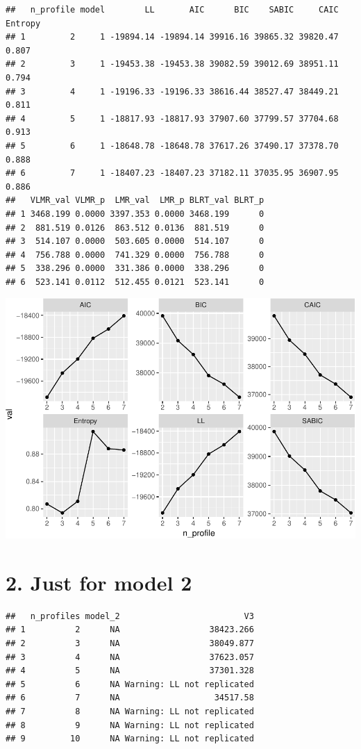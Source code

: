 \documentclass[]{book}
\theoremstyle{definition}
\theoremstyle{definition}
\theoremstyle{definition}
\theoremstyle{remark}
\begin{document}
\begin{verbatim}
##   n_profile model        LL       AIC      BIC    SABIC     CAIC Entropy
## 1         2     1 -19894.14 -19894.14 39916.16 39865.32 39820.47   0.807
## 2         3     1 -19453.38 -19453.38 39082.59 39012.69 38951.11   0.794
## 3         4     1 -19196.33 -19196.33 38616.44 38527.47 38449.21   0.811
## 4         5     1 -18817.93 -18817.93 37907.60 37799.57 37704.68   0.913
## 5         6     1 -18648.78 -18648.78 37617.26 37490.17 37378.70   0.888
## 6         7     1 -18407.23 -18407.23 37182.11 37035.95 36907.95   0.886
##   VLMR_val VLMR_p  LMR_val  LMR_p BLRT_val BLRT_p
## 1 3468.199 0.0000 3397.353 0.0000 3468.199      0
## 2  881.519 0.0126  863.512 0.0136  881.519      0
## 3  514.107 0.0000  503.605 0.0000  514.107      0
## 4  756.788 0.0000  741.329 0.0000  756.788      0
## 5  338.296 0.0000  331.386 0.0000  338.296      0
## 6  523.141 0.0112  512.455 0.0121  523.141      0
\end{verbatim}

\includegraphics{rosenberg-dissertation_files/figure-latex/compare-solutions-model1-1.pdf}

\section{2. Just for model 2}\label{just-for-model-2}

\begin{verbatim}
##   n_profiles model_2                         V3
## 1          2      NA                  38423.266
## 2          3      NA                  38049.877
## 3          4      NA                  37623.057
## 4          5      NA                  37301.328
## 5          6      NA Warning: LL not replicated
## 6          7      NA                   34517.58
## 7          8      NA Warning: LL not replicated
## 8          9      NA Warning: LL not replicated
## 9         10      NA Warning: LL not replicated
\end{verbatim}
\end{document}
